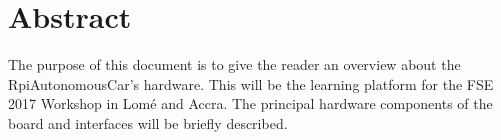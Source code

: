 \documentclass[
12pt, %
a4paper, %
oneside, %
headinclude,footinclude, %
BCOR5mm, %
table,
]{scrartcl}
\title{\normalfont\spacedallcaps{RPi based autonomous Car}} %
\author{\spacedlowsmallcaps{Fullstack Embedded (2017)} \\\spacedlowsmallcaps{Frederic Afadjigla}}
\date{} %
\begin{document}

\renewcommand{\sectionmark}[1]{\markright{\spacedlowsmallcaps{#1}}} %
\lehead{\mbox{\llap{\small\thepage\kern1em\color{halfgray} \vline}\color{halfgray}\hspace{0.5em}\rightmark\hfil}} %

\pagestyle{scrheadings} %

\maketitle %

\setcounter{tocdepth}{2} %

\tableofcontents %
\listoffigures %


\section*{Abstract} %
The purpose of this document is to give the reader an overview about the RpiAutonomousCar's hardware. This will be the learning platform for the FSE 2017 Workshop in Lomé and Accra. The principal hardware components of the board and interfaces will be briefly described.
\end{document}
